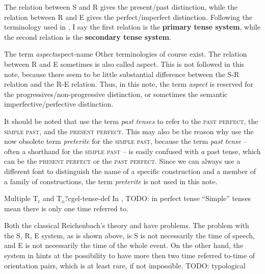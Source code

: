 \documentclass[UTF8, a4paper, oneside, scheme=plain]{ctexrep}
\newcommand*{\citepage}[1]{p.~{#1}}
\newcommand*{\concept}[1]{\textbf{#1}}
\newcommand*{\term}[1]{\emph{#1}}
\newcommand{\referredtime}{T$_{\text{r}}$}
\newcommand{\orientationtime}{T$_{\text{o}}$}
\newcommand{\category}[1]{\textsc{#1}}
\begin{document}
The relation between S and R gives the present/past distinction,
while the relation between R and E gives the perfect/imperfect distinction.
Following the terminology used in \citet{cgel}, 
I say the first relation is the \concept{primary tense system},
while the second relation is the \concept{secondary tense system}.

\begin{infobox}{The term \term{aspect}}{aspect-name}
    Other terminologies of course exist.
    The relation between R and E sometimes is also called aspect.
    This is not followed in this note,
    because there seem to be little substantial difference
    between the S-R relation and the R-E relation.
    Thus, in this note, the term \term{aspect} is reserved 
    for the progressives/non-progressive distinction,
    or sometimes the semantic imperfective/perfective distinction.

    It should be noted that \citet[\citepage{148}, \citepage{153}]{cgel}
    use the term \term{past tenses} to refer to 
    the \category{past perfect}, the \category{simple past}, and the \category{present perfect}.
    This may also be the reason why \citet{cgel}
    use the now obsolete term \term{preterite} for the \category{simple past},
    because the term \term{past tense} -- often a shorthand for the \category{simple past} -- 
    is easily confused with \emph{a} past tense,
    which can be the \category{present perfect} or the \category{past perfect}.
    Since we can always use a different font to 
    distinguish the name of a specific construction 
    and a member of a family of constructions,
    the term \term{preterite} is not used in this note.
\end{infobox}

\begin{infobox}{Multiple \referredtime{} and \orientationtime?}{cgel-tense-def}
    In \citet[\citepage{141}]{cgel}, TODO: in perfect tense
    ``Simple'' tenses mean there is only one time referred to.

    Both the classical Reichenbach's theory and \citet{cgel} have problems.
    The problem with the S, R, E system, as is shown above,
    is S is not necessarily the time of speech,
    and E is not necessarily the time of the whole event.
    On the other hand, the system in \citet{cgel} hints at 
    the possibility to have more then two time referred to-time of orientation pairs,
    which is at least rare, if not impossible. TODO: typological
\end{infobox}
\end{document}
